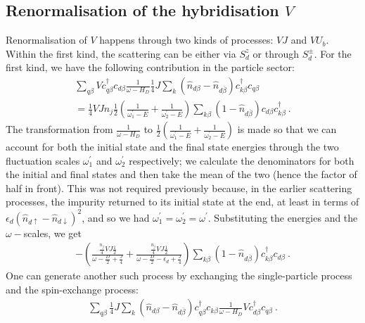 \subsection{Renormalisation of the hybridisation \(V\)}
Renormalisation of \(V\) happens through two kinds of processes: \(VJ\) and \(VU_b\). Within the first kind, the scattering can be either via \(S_d^z\) or through \(S_d^\pm\). For the first kind, we have the following contribution in the particle sector:
\begin{eqnarray}
	\sum_{q\beta} Vc^\dagger_{q\beta} c_{d\beta} \frac{1}{\omega - H_D}\frac{1}{4}J \sum_{k} \left(\hat n_{d\beta} - \hat n_{d\overline\beta}\right) c^\dagger_{k\beta}c_{q\beta} \nonumber\\
	= \frac{1}{4}V J n_j \frac{1}{2}\left(\frac{1}{\omega^\prime_1 - E} + \frac{1}{\omega^\prime_2 - E}\right)\sum_{k\beta} \left(1 - \hat n_{d\overline\beta}\right) c_{d\beta}c^\dagger_{k\beta}~.
\end{eqnarray}
The transformation from \(\frac{1}{\omega - H_D}\) to \(\frac{1}{2}\left(\frac{1}{\omega^\prime_1 - E} + \frac{1}{\omega^\prime_2 - E}\right)\) is made so that we can account for both the initial state and the final state energies through the two fluctuation scales \(\omega^\prime_1\) and \(\omega_2^\prime\) respectively; we calculate the denominators for both the initial and final states and then take the mean of the two (hence the factor of half in front). This was not required previously because, in the earlier scattering processes, the impurity returned to its initial state at the end, at least in terms of \(\epsilon_d \left( \hat n_{d \uparrow} - \hat n_{d \downarrow} \right)^2 \), and so we had \(\omega_1^\prime = \omega_2^\prime = \omega^\prime\).
Substituting the energies and the \(\omega-\)scales, we get
\begin{eqnarray}
	-\left(\frac{\frac{n_j}{4}V J \frac{1}{2}}{\omega - \frac{D}{2} + \frac{J}{4}} + \frac{\frac{n_j}{4}V J \frac{1}{2}}{\omega - \frac{D}{2} - \epsilon_d + \frac{J}{4}}\right)\sum_{k\beta}\left(1 - \hat n_{d\overline\beta}\right) c^\dagger_{k\beta} c_{d\beta}~.
\end{eqnarray}
One can generate another such process by exchanging the single-particle process and the spin-exchange process:
\begin{eqnarray}
	\sum_{q\beta} \frac{1}{4}J \sum_{k} \left(\hat n_{d\beta} - \hat n_{d\overline\beta}\right) c^\dagger_{q\beta}c_{k\beta} \frac{1}{\omega - H_D} V c^\dagger_{d\beta} c_{q\beta}~.
\end{eqnarray}
